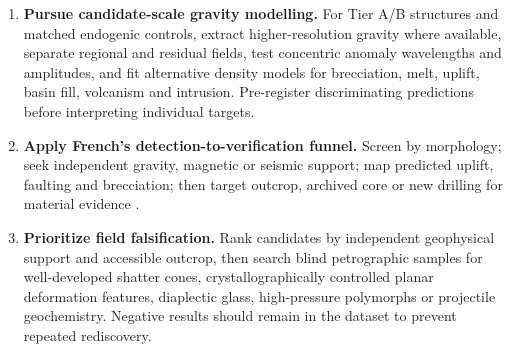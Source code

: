 \documentclass[11pt]{article}
\begin{document}
\begin{enumerate}
  \item \textbf{Pursue candidate-scale gravity modelling.} For Tier A/B structures and matched endogenic controls, extract higher-resolution gravity where available, separate regional and residual fields, test concentric anomaly wavelengths and amplitudes, and fit alternative density models for brecciation, melt, uplift, basin fill, volcanism and intrusion. Pre-register discriminating predictions before interpreting individual targets.
  \item \textbf{Apply French's detection-to-verification funnel.} Screen by morphology; seek independent gravity, magnetic or seismic support; map predicted uplift, faulting and brecciation; then target outcrop, archived core or new drilling for material evidence \cite[pp.~97--100]{French1998}.
  \item \textbf{Prioritize field falsification.} Rank candidates by independent geophysical support and accessible outcrop, then search blind petrographic samples for well-developed shatter cones, crystallographically controlled planar deformation features, diaplectic glass, high-pressure polymorphs or projectile geochemistry. Negative results should remain in the dataset to prevent repeated rediscovery.
\end{enumerate}
\end{document}
